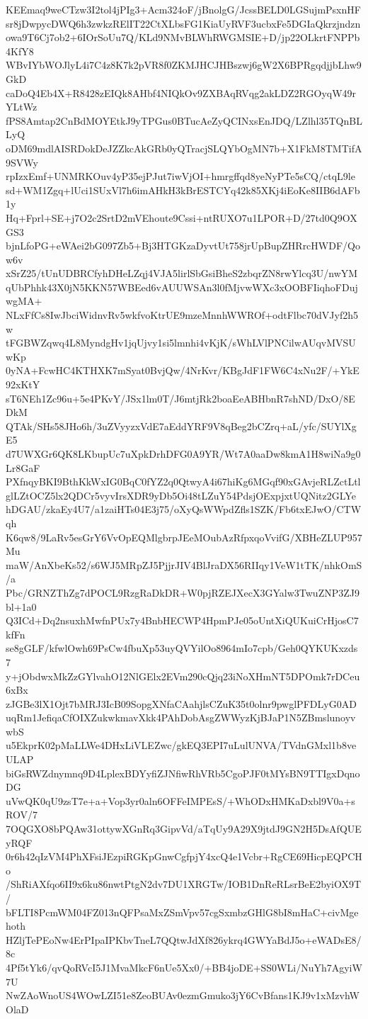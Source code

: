 KEEmaq9weCTzw3I2tol4jPIg3+Acm324oF/jBnolgG/JcssBELD0LGSujmPsxnHF
sr8jDwpycDWQ6h3zwkzRElIT22CtXLbsFG1KiaUyRVF3ucbxFe5DGIaQkrzjndzn
owa9T6Cj7ob2+6IOrSoUu7Q/KLd9NMvBLWhRWGMSIE+D/jp22OLkrtFNPPb4KfY8
WBvIYbWOJlyL4i7C4z8K7k2pVR8f0ZKMJHCJHBszwj6gW2X6BPRgqdjjbLhw9GkD
caDoQ4Eb4X+R8428zEIQk8AHbf4NIQkOv9ZXBAqRVqg2akLDZ2RGOyqW49rYLtWz
fPS8Amtap2CnBdMOYEtkJ9yTPGus0BTucAeZyQCINxsEnJDQ/LZlhl35TQnBLLyQ
oDM69mdlAISRDokDeJZZkcAkGRb0yQTracjSLQYbOgMN7b+X1FkM8TMTifA9SVWy
rpIzxEmf+UNMRKOuv4yP35ejPJut7iwVjOI+hmrgffqd8yeNyPTe5sCQ/ctqL9le
sd+WM1Zgq+lUci1SUxVl7h6imAHkH3kBrESTCYq42k85XKj4iEoKe8IIB6dAFb1y
Hq+Fprl+SE+j7O2c2SrtD2mVEhoute9Cssi+ntRUXO7u1LPOR+D/27td0Q9OXGS3
bjnLfoPG+eWAei2bG097Zb5+Bj3HTGKzaDyvtUt758jrUpBupZHRrcHWDF/Qow6v
xSrZ25/tUnUDBRCfyhDHeLZqj4VJA5lirlSbGsiBheS2zbqrZN8rwYlcq3U/nwYM
qUbPhhk43X0jN5KKN57WBEed6vAUUWSAn3l0fMjvwWXc3xOOBFIiqhoFDujwgMA+
NLxFfCs8IwJbciWidnvRv5wkfvoKtrUE9mzeMnnhWWROf+odtFlbc70dVJyf2h5w
tFGBWZqwq4L8MyndgHv1jqUjvy1si5lmnhi4vKjK/sWhLVlPNCilwAUqvMVSUwKp
0yNA+FcwHC4KTHXK7mSyat0BvjQw/4NrKvr/KBgJdF1FW6C4xNu2F/+YkE92xKtY
sT6NEh1Zc96u+5e4PKvY/JSx1lm0T/J6mtjRk2boaEeABHbnR7shND/DxO/8EDkM
QTAk/SHs58JHo6h/3uZVyyzxVdE7aEddYRF9V8qBeg2bCZrq+aL/yfc/SUYlXgE5
d7UWXGr6QK8LKbupUc7uXpkDrhDFG0A9YR/Wt7A0aaDw8kmA1H8wiNa9g0Lr8GaF
PXfnqyBKI9BthKkWxIG0BqC0fYZ2q0QtwyA4i67hiKg6MGqf90xGAvjeRLZctLtl
glLZtOCZ5lx2QDCr5vyvIrsXDR9yDb5Oi48tLZuY54PdsjOExpjxtUQNitz2GLYe
hDGAU/zkaEy4U7/a1zaiHTs04E3j75/oXyQsWWpdZfls1SZK/Fb6txEJwO/CTWqh
K6qw8/9LaRv5esGrY6VvOpEQMlgbrpJEeMOubAzRfpxqoVvifG/XBHeZLUP957Mu
maW/AnXbeKs52/s6WJ5MRpZJ5PjjrJIV4BlJraDX56RIIqy1VeW1tTK/nhkOmS/a
Pbc/GRNZThZg7dPOCL9RzgRaDkDR+W0pjRZEJXecX3GYalw3TwuZNP3ZJ9bl+1a0
Q3ICd+Dq2nsuxhMwfnPUx7y4BnbHECWP4HpmPJe05oUntXiQUKuiCrHjosC7kfFn
se8gGLF/kfwlOwh69PsCw4fbuXp53uyQVYilOo8964mIo7cpb/Geh0QYKUKxzds7
y+jObdwxMkZzGYlvahO12NlGElx2EVm290cQjq23iNoXHmNT5DPOmk7rDCeu6xBx
zJGBe3lX1Ojt7bMRJ3IcB09SopgXNfaCAahjlsCZuK35t0olnr9pwglPFDLyG0AD
uqRm1JefiqaCfOIXZukwkmavXkk4PAhDobAsgZWWyzKjBJaP1N5ZBmslunoyvwbS
u5EkprK02pMaLLWe4DHxLiVLEZwc/gkEQ3EPI7uLulUNVA/TVdnGMxl1b8veULAP
biGsRWZdnymnq9D4LplexBDYyfiZJNfiwRhVRb5CgoPJF0tMYsBN9TTIgxDqnoDG
uVwQK0qU9zsT7e+a+Vop3yr0aln6OFFeIMPEsS/+WhODxHMKaDxbl9V0a+sROV/7
7OQGXO8bPQAw31ottywXGnRq3GipvVd/aTqUy9A29X9jtdJ9GN2H5DsAfQUEyRQF
0r6h42qIzVM4PhXFsiJEzpiRGKpGnwCgfpjY4xcQ4e1Vcbr+RgCE69HicpEQPCHo
/ShRiAXfqo6II9x6ku86nwtPtgN2dv7DU1XRGTw/IOB1DnReRLsrBeE2byiOX9T/
bFLTI8PcmWM04FZ013nQFPsaMxZSmVpv57cgSxmbzGHlG8bI8mHaC+civMgehoth
HZljTePEoNw4ErPIpaIPKbvTneL7QQtwJdXf826ykrq4GWYaBdJ5o+eWADsE8/8c
4Pf5tYk6/qvQoRVcI5J1MvaMkcF6nUe5Xx0/+BB4joDE+SS0WLi/NuYh7AgyiW7U
NwZAoWnoUS4WOwLZI51e8ZeoBUAv0ezmGmuko3jY6CvBfans1KJ9v1xMzvhWOlaD
